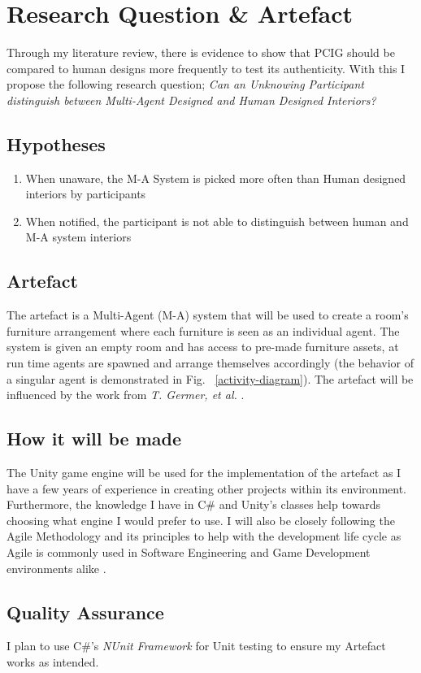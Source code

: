 \section{Research Question \& Artefact}


Through my literature review, there is evidence to show that PCIG should be compared to human designs more frequently to test its authenticity. With this I propose the following research question; \textit{Can an Unknowing Participant distinguish between Multi-Agent Designed and Human Designed Interiors?}

\subsection{Hypotheses}
\begin{enumerate}
    \item When unaware, the M-A System is picked more often than Human designed interiors by participants
    \item When notified, the participant is not able to distinguish between human and M-A system interiors
\end{enumerate}

\subsection{Artefact}
The artefact is a Multi-Agent (M-A) system that will be used to create a room's furniture arrangement where each furniture is seen as an individual agent. The system is given an empty room and has access to pre-made furniture assets, at run time agents are spawned and arrange themselves accordingly (the behavior of a singular agent is demonstrated in Fig. ~\ref{activity-diagram}). The artefact will be influenced by the work from \textit{T. Germer, et al.} \cite{real-time-walkthroughs}.

\subsection{How it will be made} 
The Unity game engine\cite{unity} will be used for the implementation of the artefact as I have a few years of experience in creating other projects within its environment. Furthermore, the knowledge I have in C\# and Unity's classes help towards choosing what engine I would prefer to use.
I will also be closely following the Agile Methodology and its principles to help with the development life cycle as Agile is commonly used in Software Engineering and Game Development environments alike \cite{game-dev-agile}.

\subsection{Quality Assurance} 
I plan to use C\#'s \textit{NUnit Framework} \cite{nunit-framework} for Unit testing to ensure my Artefact works as intended.
